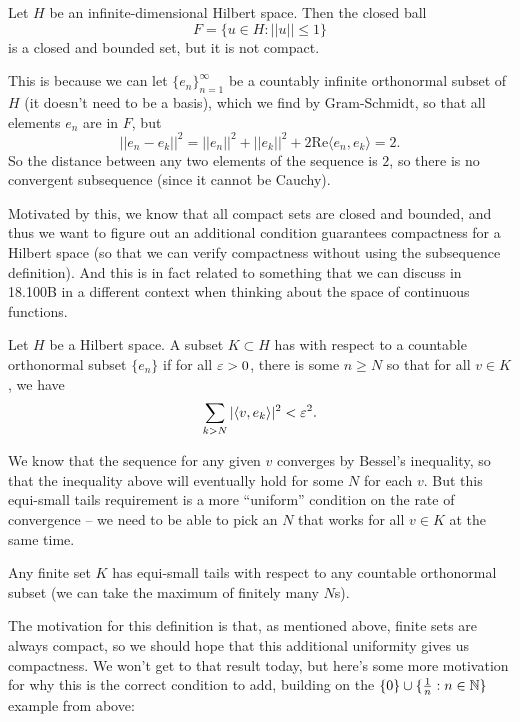 \begin{example}
Let $H$ be an infinite-dimensional Hilbert space. Then the closed ball 
\[
    F = \{u \in H: ||u|| \le 1\}
\]
is a closed and bounded set, but it is not compact.
\end{example}

This is because we can let $\{e_n\}_{n=1}^{\infty}$ be a countably infinite orthonormal subset of $H$ (it doesn't need to be a basis), which we find by Gram-Schmidt, so that all elements $e_n$ are in $F$, but 
\[
    ||e_n - e_k||^2 = ||e_n||^2 + ||e_k||^2 + 2 \text{Re}\langle e_n, e_k \rangle = 2.
\]
So the distance between any two elements of the sequence is $2$, so there is no convergent subsequence (since it cannot be Cauchy).

Motivated by this, we know that all compact sets are closed and bounded, and thus we want to figure out an additional condition guarantees compactness for a Hilbert space (so that we can verify compactness without using the subsequence definition). And this is in fact related to something that we can discuss in 18.100B in a different context when thinking about the space of continuous functions.

\begin{definition}
Let $H$ be a Hilbert space. A subset $K \subset H$ has  with respect to a countable orthonormal subset $\{e_n\}$ if for all $\varepsilon > 0$, there is some $n \ge N$ so that for all $v \in K$, we have
\[
    \sum_{k > N} |\langle v, e_k \rangle|^2 < \varepsilon^2.
\]
\end{definition}

We know that the sequence for any given $v$ converges by Bessel's inequality, so that the inequality above will eventually hold for some $N$ for each $v$. But this equi-small tails requirement is a more ``uniform'' condition on the rate of convergence -- we need to be able to pick an $N$ that works for all $v \in K$ at the same time. 

\begin{example}
Any finite set $K$ has equi-small tails with respect to any countable orthonormal subset (we can take the maximum of finitely many $N$s). 
\end{example}

The motivation for this definition is that, as mentioned above, finite sets are always compact, so we should hope that this additional uniformity gives us compactness. We won't get to that result today, but here's some more motivation for why this is the correct condition to add, building on the $\{0\} \cup \{\frac{1}{n}: n \in \mathbb N\}$ example from above:

